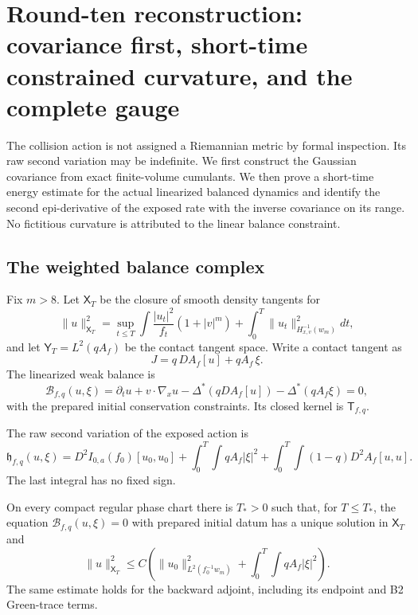 \section{Round-ten reconstruction: covariance first, short-time constrained curvature, and the complete gauge}
\label{sec:r10-b3}

The collision action is not assigned a Riemannian metric by formal
inspection.  Its raw second variation may be indefinite.  We first construct
the Gaussian covariance from exact finite-volume cumulants.  We then prove a
short-time energy estimate for the actual linearized balanced dynamics and
identify the second epi-derivative of the exposed rate with the inverse
covariance on its range.  No fictitious curvature is attributed to the linear
balance constraint.

\subsection{The weighted balance complex}

Fix $m>8$.  Let $\mathsf X_T$ be the closure of smooth density tangents for
\[
 \|u\|_{\mathsf X_T}^2
 =\sup_{t\le T}\int \frac{|u_t|^2}{f_t}(1+|v|^m)
 +\int_0^T\|u_t\|_{H^{-1}_{x,v}(w_m)}^2dt,
\]
and let $\mathsf Y_T=L^2(qA_f)$ be the contact tangent space.  Write a
contact tangent as
\[
 J=q\,DA_f[u]+qA_f\,\xi .
\]
The linearized weak balance is
\[
 \mathcal B_{f,q}(u,\xi)
 =\partial_tu+v\cdot\nabla_xu
  -\Delta^*(qDA_f[u])-\Delta^*(qA_f\xi)=0,
\]
with the prepared initial conservation constraints.  Its closed kernel is
$\mathsf T_{f,q}$.

The raw second variation of the exposed action is
\[
 \mathfrak h_{f,q}(u,\xi)
 =D^2I_{0,a}(f_0)[u_0,u_0]
  +\int_0^T\!\int qA_f|\xi|^2
  +\int_0^T\!\int(1-q)D^2A_f[u,u].
\]
The last integral has no fixed sign.

\begin{theorem}
\label{thm:r10-b3-linear}
On every compact regular phase chart there is $T_*>0$ such that, for
$T\le T_*$, the equation $\mathcal B_{f,q}(u,\xi)=0$ with prepared initial
datum has a unique solution in $\mathsf X_T$ and
\[
 \|u\|_{\mathsf X_T}^2
 \le C\left(
  \|u_0\|_{L^2(f_0^{-1}w_m)}^2
  +\int_0^T\!\int qA_f|\xi|^2
 \right).
\]
The same estimate holds for the backward adjoint, including its endpoint and
B2 Green-trace terms.
\end{theorem}


